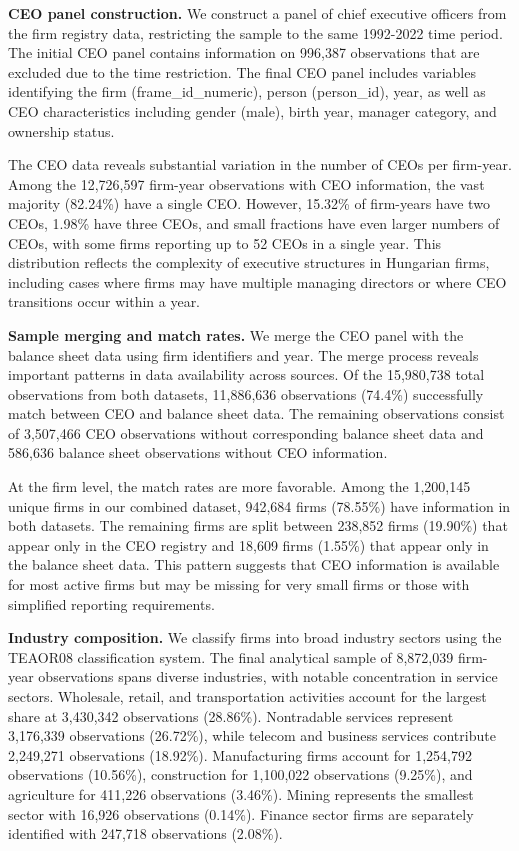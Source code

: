 \documentclass[11pt,a4paper]{article}
\begin{document}
\textbf{CEO panel construction.} We construct a panel of chief executive officers from the firm registry data, restricting the sample to the same 1992-2022 time period. The initial CEO panel contains information on 996,387 observations that are excluded due to the time restriction. The final CEO panel includes variables identifying the firm (frame\_id\_numeric), person (person\_id), year, as well as CEO characteristics including gender (male), birth year, manager category, and ownership status.

The CEO data reveals substantial variation in the number of CEOs per firm-year. Among the 12,726,597 firm-year observations with CEO information, the vast majority (82.24\%) have a single CEO. However, 15.32\% of firm-years have two CEOs, 1.98\% have three CEOs, and small fractions have even larger numbers of CEOs, with some firms reporting up to 52 CEOs in a single year. This distribution reflects the complexity of executive structures in Hungarian firms, including cases where firms may have multiple managing directors or where CEO transitions occur within a year.

\textbf{Sample merging and match rates.} We merge the CEO panel with the balance sheet data using firm identifiers and year. The merge process reveals important patterns in data availability across sources. Of the 15,980,738 total observations from both datasets, 11,886,636 observations (74.4\%) successfully match between CEO and balance sheet data. The remaining observations consist of 3,507,466 CEO observations without corresponding balance sheet data and 586,636 balance sheet observations without CEO information.

At the firm level, the match rates are more favorable. Among the 1,200,145 unique firms in our combined dataset, 942,684 firms (78.55\%) have information in both datasets. The remaining firms are split between 238,852 firms (19.90\%) that appear only in the CEO registry and 18,609 firms (1.55\%) that appear only in the balance sheet data. This pattern suggests that CEO information is available for most active firms but may be missing for very small firms or those with simplified reporting requirements.

\textbf{Industry composition.} We classify firms into broad industry sectors using the TEAOR08 classification system. The final analytical sample of 8,872,039 firm-year observations spans diverse industries, with notable concentration in service sectors. Wholesale, retail, and transportation activities account for the largest share at 3,430,342 observations (28.86\%). Nontradable services represent 3,176,339 observations (26.72\%), while telecom and business services contribute 2,249,271 observations (18.92\%). Manufacturing firms account for 1,254,792 observations (10.56\%), construction for 1,100,022 observations (9.25\%), and agriculture for 411,226 observations (3.46\%). Mining represents the smallest sector with 16,926 observations (0.14\%). Finance sector firms are separately identified with 247,718 observations (2.08\%).
\end{document}
